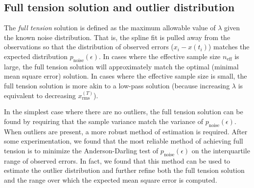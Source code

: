 \documentclass{ametsoc}
\begin{document}


\subsection{Full tension solution and outlier distribution}
\label{sec:full_tension}

The \emph{full tension} solution is defined as the maximum allowable value of $\lambda$ given the known noise distribution. That is, the spline fit is pulled away from the observations so that the distribution of observed errors ($x_i-x(t_i)$) matches the expected distribution $p_{\textrm{noise}}(\epsilon)$. In cases where the effective sample size $n_\textrm{eff}$ is large, the full tension solution will approximately match the optimal (minimal mean square error) solution. In cases where the effective sample size is small, the full tension solution is more akin to a low-pass solution (because increasing $\lambda$ is equivalent to decreasing $x^{(T)}_\textrm{rms}$).

In the simplest case where there are no outliers, the full tension solution can be found by requiring that the sample variance match the variance of $p_{\textrm{noise}}(\epsilon)$. When outliers are present, a more robust method of estimation is required. After some experimentation, we found that the most reliable method of achieving full tension is to minimize the Anderson-Darling test of $p_{\textrm{noise}}(\epsilon)$ on the interquartile range of observed errors. In fact, we found that this method can be used to estimate the outlier distribution and further refine both the full tension solution and the range over which the expected mean square error is computed.
\end{document}
